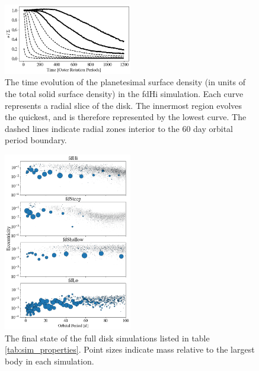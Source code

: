 \documentclass[twocolumn]{aastex63}
\begin{document}
\begin{figure}
\begin{center}
    \includegraphics[width=0.5\textwidth]{figures/pl_frac_time.png}
    \caption{The time evolution of the planetesimal surface density (in units of the total solid surface density) in the fdHi 
    simulation. Each curve represents a radial slice of the disk. The innermost region evolves the quickest, and is therefore 
    represented by the lowest curve. The dashed lines indicate radial zones interior to the 60 day orbital period boundary.\label{fig:pl_frac_time}}
\end{center}
\end{figure}

\begin{figure}
\begin{center}
    \includegraphics[width=0.5\textwidth]{figures/surfden_profiles.png}
    \caption{The final state of the full disk simulations listed in table \ref{tab:sim_properties}. 
    Point sizes indicate mass relative to the largest body in each simulation.\label{fig:surfden_profiles}}
\end{center}
\end{figure}
\end{document}
